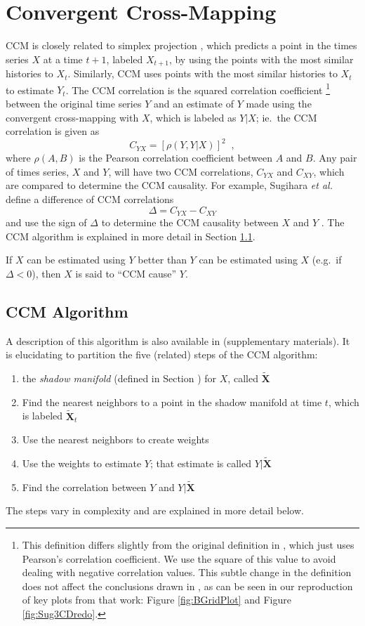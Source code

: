 \documentclass[twocolumn,aps,pre,groupedaddress]{revtex4-1}
\begin{document}
\section{Convergent Cross-Mapping}
CCM is closely related to simplex projection \cite{Sugihara1990,Sugihara1990a}, which predicts a point in the times series $X$ at a time $t+1$, labeled $X_{t+1}$, by using the points with the most similar histories to $X_t$.  Similarly, CCM uses points with the most similar histories to $X_t$ to estimate $Y_t$.  The CCM correlation is the squared correlation coefficient \footnote{This definition differs slightly from the original definition in \cite{Sugihara2012}, which just uses Pearson’s correlation coefficient.  We use the square of this value to avoid dealing with negative correlation values.  This subtle change in the definition does not affect the conclusions drawn in \cite{Sugihara2012}, as can be seen in our reproduction of key plots from that work: Figure \ref{fig:BGridPlot} and Figure \ref{fig:Sug3CDredo}.} between the original time series $Y$ and an estimate of $Y$ made using the convergent cross-mapping with $X$, which is labeled as $Y|X$; ie.\ the CCM correlation is given as 
$$
C_{YX} = \left[\rho\left(Y,Y|X\right)\right]^2\;\;,
$$
where $\rho(A,B)$ is the Pearson correlation coefficient between $A$ and $B$.  Any pair of times series, $X$ and $Y$, will have two CCM correlations, $C_{YX}$ and $C_{XY}$, which are compared to determine the CCM causality.  For example, Sugihara {\em et al.\ }\cite{Sugihara2012} define a difference of CCM correlations
\begin{equation}
\label{eqn:delta}
\Delta = C_{YX} - C_{XY}
\end{equation}
and use the sign of $\Delta$ to determine the CCM causality between $X$ and $Y$ \cite{Sugihara2012}.  The CCM algorithm is explained in more detail in Section \ref{sec:appA}.

If $X$ can be estimated using $Y$ better than $Y$ can be estimated using $X$ (e.g.\ if $\Delta < 0$), then $X$ is said to ``CCM cause'' $Y$.

\subsection{CCM Algorithm}
\label{sec:appA}
A description of this algorithm is also available in \cite{Sugihara2012} (supplementary materials).  It is elucidating to partition the five (related) steps of the CCM algorithm:
\begin{enumerate}
\item 
the {\em shadow manifold} (defined in Section \cite{sec:shadow}) for $X$, called $\tilde{\mathbf{X}}$
\item Find the nearest neighbors to a point in the shadow manifold at time $t$, which is labeled $\tilde{\mathbf{X}}_t$
\item Use the nearest neighbors to create weights
\item Use the weights to estimate $Y$; that estimate is called $Y|\tilde{\mathbf{X}}$
\item Find the correlation between $Y$ and $Y|\tilde{\mathbf{X}}$ 
\end{enumerate}
The steps vary in complexity and are explained in more detail below.
\end{document}
